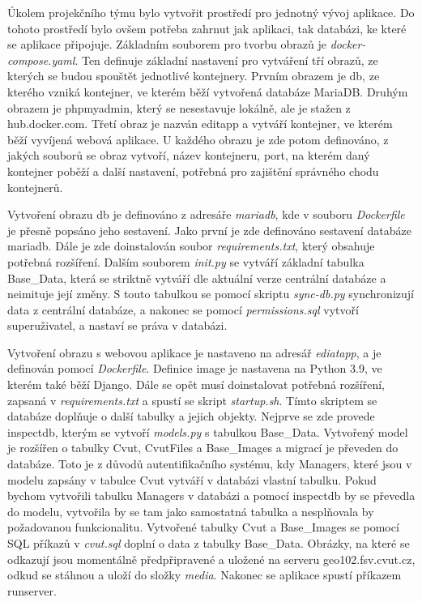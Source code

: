 Úkolem projekčního týmu bylo vytvořit prostředí pro jednotný vývoj
aplikace. Do tohoto prostředí bylo ovšem potřeba zahrnut jak aplikaci,
tak databázi, ke které se aplikace připojuje. Základním souborem pro
tvorbu obrazů je \emph{docker-compose.yaml}. Ten definuje základní
nastavení pro vytváření tří obrazů, ze kterých se budou spouštět
jednotlivé kontejnery. Prvním obrazem je db, ze kterého vzniká
kontejner, ve kterém běží vytvořená databáze MariaDB. Druhým obrazem
je phpmyadmin, který se nesestavuje lokálně, ale je stažen z
hub.docker.com. Třetí obraz je nazván editapp a vytváří kontejner, ve
kterém běží vyvíjená webová aplikace. U každého obrazu je zde potom
definováno, z jakých souborů se obraz vytvoří, název kontejneru, port,
na kterém daný kontejner poběží a další nastavení, potřebná pro
zajištění správného chodu kontejnerů.

Vytvoření obrazu db je definováno z adresáře \emph{mariadb}, kde v
souboru \emph{Dockerfile} je přesně popsáno jeho sestavení. Jako první
je zde definováno sestavení databáze mariadb. Dále je zde doinstalován
soubor \emph{requirements.txt}, který obsahuje potřebná
rozšíření. Dalším souborem \emph{init.py} se vytváří základní tabulka
Base\_Data, která se striktně vytváří dle aktuální verze centrální
databáze a neimituje její změny. S touto tabulkou se pomocí skriptu
\emph{sync-db.py} synchronizují data z centrální databáze, a nakonec
se pomocí \emph{permissions.sql} vytvoří superuživatel, a nastaví se
práva v databázi.

Vytvoření obrazu s webovou aplikace je nastaveno na adresář
\emph{ediatapp}, a je definován pomocí \emph{Dockerfile}. Definice
image je nastavena na Python 3.9, ve kterém také běží Django. Dále se
opět musí doinstalovat potřebná rozšíření, zapsaná v
\emph{requirements.txt} a spustí se skript \emph{startup.sh}. Tímto
skriptem se databáze doplňuje o další tabulky a jejich
objekty. Nejprve se zde provede inspectdb, kterým se vytvoří
\emph{models.py} s tabulkou Base\_Data. Vytvořený model je rozšířen o
tabulky Cvut, CvutFiles a Base\_Images a migrací je převeden do
databáze. Toto je z důvodů autentifikačního systému, kdy Managers,
které jsou v modelu zapsány v tabulce Cvut vytváří v databázi vlastní
tabulku. Pokud bychom vytvořili tabulku Managers v databázi a pomocí
inspectdb by se převedla do modelu, vytvořila by se tam jako
samostatná tabulka a nesplňovala by požadovanou
funkcionalitu. Vytvořené tabulky Cvut a Base\_Images se pomocí SQL
příkazů v \emph{cvut.sql} doplní o data z tabulky Base\_Data. Obrázky,
na které se odkazují jsou momentálně předpřipravené a uložené na
serveru geo102.fsv.cvut.cz, odkud se stáhnou a uloží do složky
\emph{media}. Nakonec se aplikace spustí příkazem runserver.


